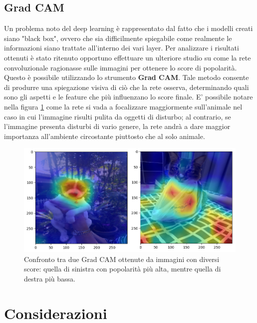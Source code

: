 \subsection{Grad CAM}

Un problema noto del deep learning è rappresentato dal fatto che i modelli creati siano "black box", ovvero che sia difficilmente spiegabile come realmente le informazioni siano trattate all'interno dei vari layer. Per analizzare i risultati ottenuti è stato ritenuto opportuno effettuare un ulteriore studio su come la rete convoluzionale ragionasse sulle immagini per ottenere lo score di popolarità. Questo è possibile utilizzando lo strumento \textbf{Grad CAM}\cite{2019}. Tale metodo consente di produrre una spiegazione visiva di ciò che la rete osserva, determinando quali sono gli aspetti e le feature che più influenzano lo score finale. E' possibile notare nella figura \ref{fig:grad-cam} come la rete si vada a focalizzare maggiormente sull'animale nel caso in cui l'immagine risulti pulita da oggetti di disturbo; al contrario, se l'immagine presenta disturbi di vario genere, la rete andrà a dare maggior importanza all'ambiente circostante piuttosto che al solo animale.

\vspace{1cm}

\begin{figure}[h]
        \centering
        \includegraphics[scale=0.6]{Plot/GRAD-CAM.png}
        \caption{Confronto tra due Grad CAM ottenute da immagini con diversi score: quella di sinistra con popolarità più alta, mentre quella di destra più bassa.}
        \label{fig:grad-cam}
\end{figure}
    


\section{Considerazioni}

